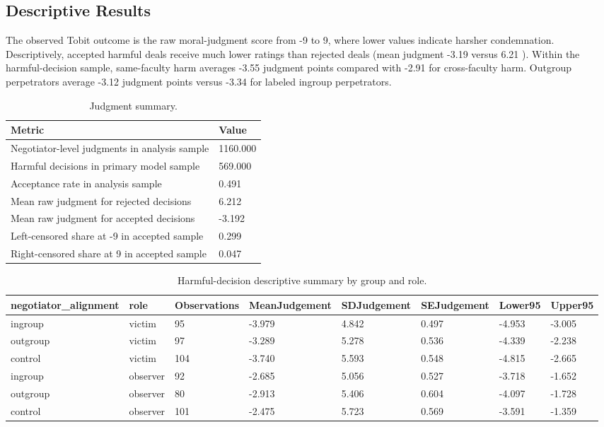 \documentclass[11pt]{article}
\begin{document}
\subsection{Descriptive Results}
The observed Tobit outcome is the raw moral-judgment score from -9 to 9, where lower values indicate harsher condemnation. Descriptively, accepted harmful deals receive much lower ratings than rejected deals (mean judgment -3.19 versus 6.21 ). Within the harmful-decision sample, same-faculty harm averages -3.55 judgment points compared with -2.91 for cross-faculty harm. Outgroup perpetrators average -3.12 judgment points versus -3.34 for labeled ingroup perpetrators.
\begin{table}[H]
\centering
\caption{Judgment summary.}
\label{tab:judgement_summary}
\begin{tabular}{ll}
\toprule
Metric & Value \\
\midrule
Negotiator-level judgments in analysis sample & 1160.000 \\
Harmful decisions in primary model sample & 569.000 \\
Acceptance rate in analysis sample & 0.491 \\
Mean raw judgment for rejected decisions & 6.212 \\
Mean raw judgment for accepted decisions & -3.192 \\
Left-censored share at -9 in accepted sample & 0.299 \\
Right-censored share at 9 in accepted sample & 0.047 \\
\bottomrule
\end{tabular}
\end{table}
\begin{table}[H]
\centering
\caption{Harmful-decision descriptive summary by group and role.}
\label{tab:harmful_summary}
\begin{tabular}{llllllll}
\toprule
negotiator\_alignment & role & Observations & MeanJudgement & SDJudgement & SEJudgement & Lower95 & Upper95 \\
\midrule
ingroup & victim & 95 & -3.979 & 4.842 & 0.497 & -4.953 & -3.005 \\
outgroup & victim & 97 & -3.289 & 5.278 & 0.536 & -4.339 & -2.238 \\
control & victim & 104 & -3.740 & 5.593 & 0.548 & -4.815 & -2.665 \\
ingroup & observer & 92 & -2.685 & 5.056 & 0.527 & -3.718 & -1.652 \\
outgroup & observer & 80 & -2.913 & 5.406 & 0.604 & -4.097 & -1.728 \\
control & observer & 101 & -2.475 & 5.723 & 0.569 & -3.591 & -1.359 \\
\bottomrule
\end{tabular}
\end{table}
\end{document}
